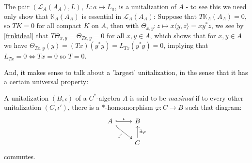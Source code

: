 \begin{example}
	The pair $(\mathcal{L}_A(A_A),L)$, $L\colon a \mapsto L_a$, is a unitalization of $A$ - to see this we need only show that $\mathbb{K}_A(A_A)$ is essential in $\mathcal{L}_A(A_A)$: Suppose that $T \mathbb{K}_A(A_A)=0$, so $TK = 0$ for all compact $K$ on $A$, then with $\Theta_{x,y} \colon z \mapsto x\langle y,z\rangle = xy^*z$, we see by \ref{frnkideal} that $T \Theta_{x,y}=\Theta_{Tx,y}= 0$ for all $x, y \in A$, which shows that for $x,y \in A$ we have $\Theta_{Tx,y}(y) = (Tx)(y^*y)=L_{Tx}(y^*y)=0$, implying that $L_{Tx}=0 \iff Tx = 0$ so $T=0$. 
\end{example}
And, it makes sense to talk about a 'largest' unitalization, in the sense that it has a certain universal property:
\begin{definition}
	A unitalization $(B, \iota)$ of a $C^*$-algebra $A$ is said to be \emph{maximal} if to every other unitalization $(C,\iota')$, there is a $*$-homomorphism $\varphi \colon C \to B$ such that diagram:
	\begin{equation}
	\begin{tikzcd}
		A\arrow[dr,"\iota'"', hook] \arrow[r, "\iota", hook] & B \\
		& C \arrow[u, "\exists \varphi"']
	\end{tikzcd}
	\end{equation}
	commutes.
\end{definition}

